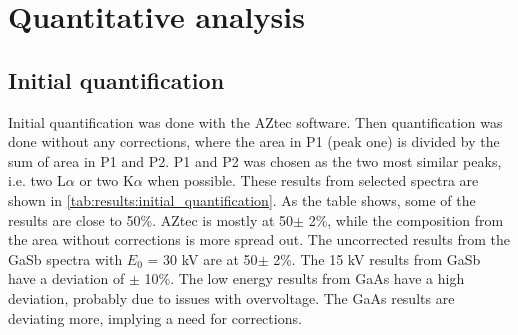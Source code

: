 
\clearpage

















\section{Quantitative analysis}
\label{results:quantitative}




\subsection{Initial quantification}
\label{results:initial_quantification}

Initial quantification was done with the AZtec software.
Then quantification was done without any corrections, where the area in P1 (peak one) is divided by the sum of area in P1 and P2.
P1 and P2 was chosen as the two most similar peaks, i.e. two L$\alpha$ or two K$\alpha$ when possible.
These results from selected spectra are shown in \cref{tab:results:initial_quantification}.
As the table shows, some of the results are close to 50\%.
AZtec is mostly at 50$\pm$ 2\%, while the composition from the area without corrections is more spread out.
The uncorrected results from the GaSb spectra with $E_0$ = 30 kV are at 50$\pm$ 2\%.
The 15 kV results from GaSb have a deviation of $\pm$ 10\%.
The low energy results from GaAs have a high deviation, probably due to issues with overvoltage.
The GaAs results are deviating more, implying a need for corrections.




